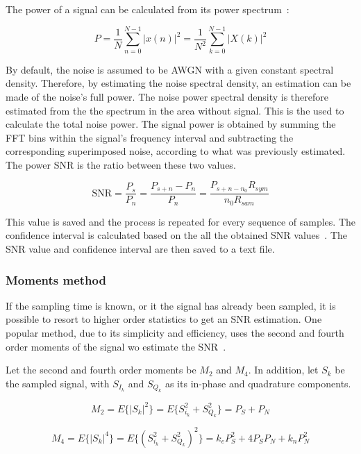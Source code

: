 \begin{refsection}
The power of a signal can be calculated from its power spectrum~\cite{john2007digital}:

\begin{equation}
P = \frac{1}{N} \sum_{n=0}^{N-1} {|x(n)|}^2 = \frac{1}{N^2} \sum_{k=0}^{N-1} {|X(k)|}^2
\end{equation}


By default, the noise is assumed to be AWGN with a given constant spectral
density. Therefore, by estimating the noise spectral density, an estimation can
be made of the noise's full power. The noise power spectral density is therefore
estimated from the the spectrum in the area without signal. This is the used to
calculate the total noise power. The signal power is obtained by summing the FFT
bins within the signal's frequency interval and subtracting the corresponding superimposed noise, according to what was previously estimated. The power SNR is the ratio between these two values.

\begin{equation}
	\text{SNR} = \frac{P_{s}}{P_n} = \frac{P_{s+n} - P_n}{P_n} = \frac{P_{s+n - n_0} R_{sym}}{n_0 R_{sam}}
\end{equation}

This value is saved and the process is repeated for every sequence of samples.
The confidence interval is calculated based on the all the obtained SNR
values~\cite{tranter2004principles}. The SNR value and confidence interval are
then saved to a text file.

\subsubsection*{Moments method}\label{sec:snrEstm2m4}
If the sampling time is known, or it the signal has already been sampled, it is
possible to resort to higher order statistics to get an SNR estimation. One
popular method, due to its simplicity and efficiency, uses the second and fourth
order moments of the signal wo estimate the SNR~\cite{matzner93}.

Let the second and fourth order moments be $M_2$ and $M_4$. In addition, let
$S_k$ be the sampled signal, with $S_{I_k}$ and $S_{Q_k}$ as its in-phase and
quadrature components.

\begin{equation}
	M_2 = E\{|S_k|^2\} = E\{S_{i_k}^2 + S_{Q_k}^2\} = P_S + P_N
\end{equation}

\begin{equation}
	M_4 = E\{|S_k|^4\} = E\{(S_{i_k}^2 + S_{Q_k}^2)^2\} = k_e P_S^2 + 4P_S P_N + k_n P_N^2
\end{equation}


\end{refsection}
